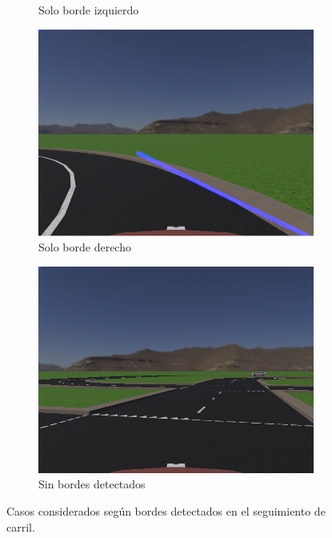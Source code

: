 \begin{figure}[h]
\begin{subfigure}[b]{0.2\textwidth}
         \caption{Solo borde izquierdo}
         \label{fig:left_border_detected}
     \end{subfigure}
     \hfill
     \begin{subfigure}[b]{0.2\textwidth}
         \centering
         \includegraphics[width=\textwidth]{Figures/Figures_Cap04/right_border_detected.png}
         \caption{Solo borde derecho}
         \label{fig:right_border_detected}
     \end{subfigure}
     \hfill
     \begin{subfigure}[b]{0.2\textwidth}
         \centering
         \includegraphics[width=\textwidth]{Figures/Figures_Cap04/no_borders_detected.png}
         \caption{Sin bordes detectados}
         \label{fig:no_edge_detected}
     \end{subfigure}
     
    \caption{Casos considerados según bordes detectados en el seguimiento de carril.}
    \label{fig:lane_detect_tracking}
\end{figure}

